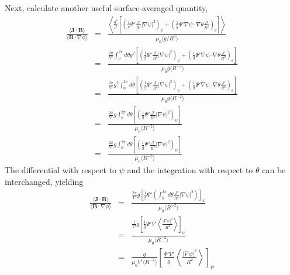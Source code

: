 \documentclass{llncs}
\begin{document}
Next, calculate another useful surface-averaged quantity,
\begin{eqnarray}
  \frac{\langle \mathbf{J} \cdot \mathbf{B} \rangle}{\langle \mathbf{B} \cdot
  \nabla \phi \rangle} & = & \frac{\left\langle \frac{g^2}{\mathcal{J}} \left[
  \left( \frac{1}{g} \Psi' \frac{\mathcal{J}}{R^2} | \nabla \psi |^2
  \right)_{\psi} + \left( \frac{1}{g} \Psi' \nabla \psi \cdot \nabla \theta
  \frac{\mathcal{J}}{R^2} \right)_{\theta} \right] \right\rangle}{\mu_0
  \langle g / R^2 \rangle} \nonumber\\
  & = & \frac{\frac{2 \pi}{V'} \int_0^{2 \pi} d \theta g^2 \left[ \left(
  \frac{1}{g} \Psi' \frac{\mathcal{J}}{R^2} | \nabla \psi |^2 \right)_{\psi} +
  \left( \frac{1}{g} \Psi' \nabla \psi \cdot \nabla \theta
  \frac{\mathcal{J}}{R^2} \right)_{\theta} \right]}{\mu_0 g \langle R^{- 2}
  \rangle} \nonumber\\
  & = & \frac{\frac{2 \pi}{V'} g^2 \int_0^{2 \pi} d \theta \left[ \left(
  \frac{1}{g} \Psi' \frac{\mathcal{J}}{R^2} | \nabla \psi |^2 \right)_{\psi} +
  \left( \frac{1}{g} \Psi' \nabla \psi \cdot \nabla \theta
  \frac{\mathcal{J}}{R^2} \right)_{\theta} \right]}{\mu_0 g \langle R^{- 2}
  \rangle} \nonumber\\
  & = & \frac{\frac{2 \pi}{V'} g \int_0^{2 \pi} d \theta \left[ \left(
  \frac{1}{g} \Psi' \frac{\mathcal{J}}{R^2} | \nabla \psi |^2 \right)_{\psi}
  \right]}{\mu_0 \langle R^{- 2} \rangle} \nonumber\\
  & = & \frac{\frac{2 \pi}{V'} g \int_0^{2 \pi} d \theta \left[ \left(
  \frac{1}{g} \Psi' \frac{\mathcal{J}}{R^2} | \nabla \psi |^2 \right)_{\psi}
  \right]}{\mu_0 \langle R^{- 2} \rangle} 
\end{eqnarray}
The differential with respect to $\psi$ and the integration with respect to
$\theta$ can be interchanged, yielding
\begin{eqnarray}
  \frac{\langle \mathbf{J} \cdot \mathbf{B} \rangle}{\langle \mathbf{B} \cdot
  \nabla \phi \rangle} & = & \frac{\frac{2 \pi}{V'} g \left[ \frac{1}{g} \Psi'
  \left( \int_0^{2 \pi} d \theta \frac{\mathcal{J}}{R^2} | \nabla \psi |^2
  \right) \right]_{\psi}}{\mu_0 \langle R^{- 2} \rangle} \nonumber\\
  & = & \frac{\frac{1}{V'} g \left[ \frac{1}{g} \Psi' V' \left\langle \frac{|
  \nabla \psi |^2}{R^2} \right\rangle \right]_{\psi}}{\mu_0 \langle R^{- 2}
  \rangle} \nonumber\\
  & = & \frac{g}{\mu_0 V' \langle R^{- 2} \rangle} \left[ \frac{\Psi' V'}{g}
  \left\langle \frac{| \nabla \psi |^2}{R^2} \right\rangle \right]_{\psi} 
\end{eqnarray}
\end{document}

